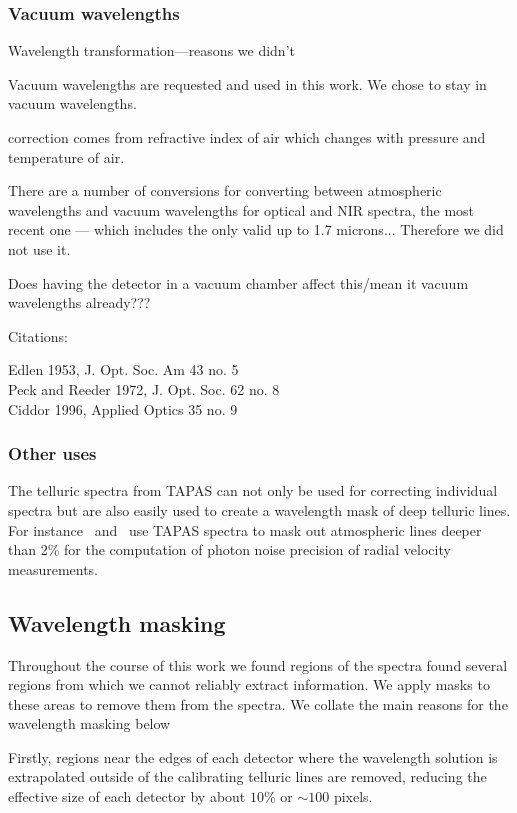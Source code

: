 \subsubsection{Vacuum wavelengths}

Wavelength transformation---reasons we didn't

Vacuum wavelengths are requested and used in this work.
We chose to stay in vacuum wavelengths.  

correction comes from refractive index of air which changes with pressure and temperature of air.

There are a number of conversions for converting between atmospheric wavelengths and vacuum wavelengths for optical and NIR spectra, the most recent one --- which includes the \nir only valid up to 1.7 microns...    
Therefore we did not use it. 

Does having the detector in a vacuum chamber affect this/mean it vacuum wavelengths already???

Citations:

        Edlen 1953, J. Opt. Soc. Am 43 no. 5\\
        Peck and Reeder 1972, J. Opt. Soc. 62 no. 8\\
        Ciddor 1996, Applied Optics 35 no. 9


\subsubsection{Other uses}
The telluric spectra from TAPAS can not only be used for correcting individual spectra but are also easily used to create a wavelength mask of deep telluric lines. For instance~\citet{figueira_radial_2016} and~\citet{artigau_optical_2018} use TAPAS spectra to mask out atmospheric lines deeper than 2\% for the computation of photon noise precision of radial velocity measurements. 


\subsection{Wavelength masking}
Throughout the course of this work we found regions of the spectra found several regions from which we cannot reliably extract information.
We apply masks to these areas to remove them from the spectra. We collate the main reasons for the wavelength masking below 

Firstly, regions near the edges of each detector where the wavelength solution is extrapolated outside of the calibrating telluric lines are removed, reducing the effective size of each detector by about \(10\%\) or \(\sim100\) pixels. 


